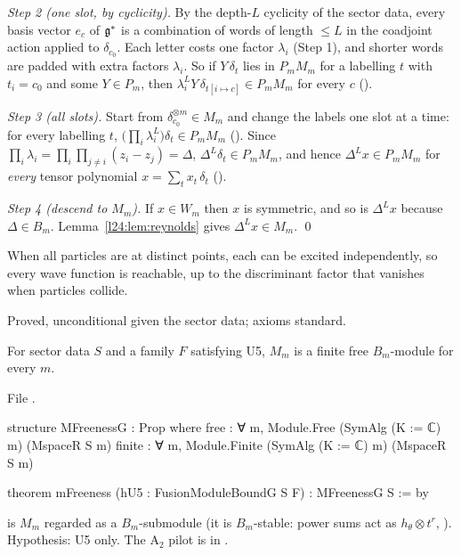 \emph{Step 2 (one slot, by cyclicity).} By the depth-$L$ cyclicity of the sector data, every basis vector $e_c$ of
$\mathfrak g^*$ is a combination of words of length $\le L$ in the coadjoint action applied to $\delta_{c_0}$. Each letter costs
one factor $\lambda_i$ (Step 1), and shorter words are padded with extra factors $\lambda_i$. So if $Y\,\delta_{t}$ lies in
$P_mM_m$ for a labelling $t$ with $t_i=c_0$ and some $Y\in P_m$, then $\lambda_i^LY\,\delta_{t[i\mapsto c]}\in P_mM_m$ for every $c$
().

\emph{Step 3 (all slots).} Start from $\delta_{c_0}^{\otimes m}\in M_m$ and change the labels one slot at a time: for every
labelling $t$, $\bigl(\prod_i\lambda_i^L\bigr)\delta_t\in P_mM_m$ (). Since $\prod_i\lambda_i=\prod_i\prod_{j\neq i}(z_i-z_j)=\Delta$,
$\Delta^L\delta_t\in P_mM_m$, and hence $\Delta^Lx\in P_mM_m$ for \emph{every} tensor polynomial $x=\sum_tx_t\,\delta_t$
().

\emph{Step 4 (descend to $M_m$).} If $x\in W_m$ then $x$ is symmetric, and so is $\Delta^Lx$ because $\Delta\in B_m$.
Lemma~\ref{l24:lem:reynolds} gives $\Delta^Lx\in M_m$. \qed

\begin{physics}
When all particles are at distinct points, each can be excited independently, so every wave function is reachable,
up to the discriminant factor that vanishes when particles collide.
\end{physics}

\begin{status}
Proved, unconditional given the sector data; axioms standard.
\end{status}

\begin{theorem}\label{l24:thm:B6}
For sector data $S$ and a family $F$ satisfying U5, $M_m$ is a finite free $B_m$-module for every $m$.
\end{theorem}
\noindent File .
\begin{leancode}
structure MFreenessG : Prop where
  free : ∀ m, Module.Free (SymAlg (K := ℂ) m) (MspaceR S m)
  finite : ∀ m, Module.Finite (SymAlg (K := ℂ) m) (MspaceR S m)

theorem mFreeness (hU5 : FusionModuleBoundG S F) : MFreenessG S := by
\end{leancode}

\begin{dictionary}
 is $M_m$ regarded as a $B_m$-submodule (it is $B_m$-stable: power sums act as
$h_\theta\otimes t^r$, ). Hypothesis: U5 only. The A$_2$ pilot is
 in .
\end{dictionary}

